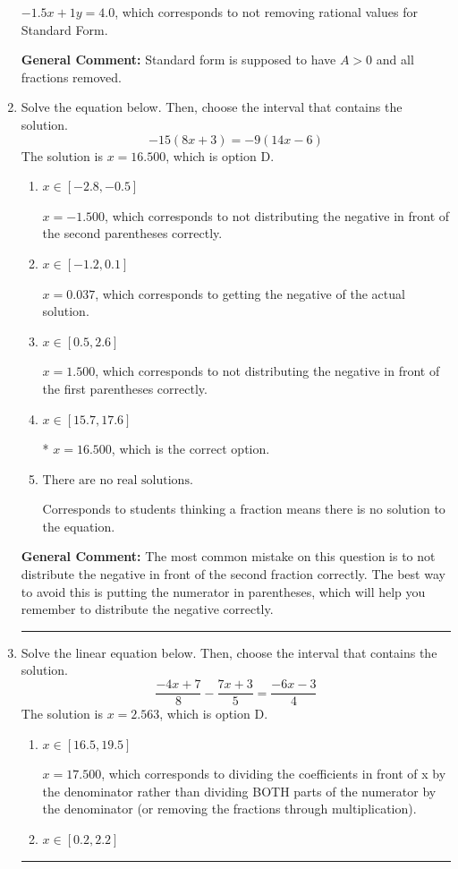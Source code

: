 \documentclass{extbook}[14pt]
\newcommand{\litem}[1]{\item #1

\rule{\textwidth}{0.4pt}}
\begin{document}
\begin{enumerate}
{\begin{enumerate}[label=\Alph*.]
 $-1.5x + 1y = 4.0$, which corresponds to not removing rational values for Standard Form.
\end{enumerate}

\textbf{General Comment:} Standard form is supposed to have $A > 0$ and all fractions removed.
}
\litem{
Solve the equation below. Then, choose the interval that contains the solution.
\[ -15(8x + 3) = -9(14x -6) \]The solution is \( x = 16.500 \), which is option D.\begin{enumerate}[label=\Alph*.]
\item \( x \in [-2.8, -0.5] \)

$x = -1.500$, which corresponds to not distributing the negative in front of the second parentheses correctly.
\item \( x \in [-1.2, 0.1] \)

$x = 0.037$, which corresponds to getting the negative of the actual solution.
\item \( x \in [0.5, 2.6] \)

$x = 1.500$, which corresponds to not distributing the negative in front of the first parentheses correctly.
\item \( x \in [15.7, 17.6] \)

* $x = 16.500$, which is the correct option.
\item \( \text{There are no real solutions.} \)

Corresponds to students thinking a fraction means there is no solution to the equation.
\end{enumerate}

\textbf{General Comment:} The most common mistake on this question is to not distribute the negative in front of the second fraction correctly. The best way to avoid this is putting the numerator in parentheses, which will help you remember to distribute the negative correctly.
}
\litem{
Solve the linear equation below. Then, choose the interval that contains the solution.
\[ \frac{-4x + 7}{8} - \frac{7x + 3}{5} = \frac{-6x -3}{4} \]The solution is \( x = 2.563 \), which is option D.\begin{enumerate}[label=\Alph*.]
\item \( x \in [16.5, 19.5] \)

 $x = 17.500$, which corresponds to dividing the coefficients in front of x by the denominator rather than dividing BOTH parts of the numerator by the denominator (or removing the fractions through multiplication).
\item \( x \in [0.2, 2.2] \)


\end{enumerate}}
\end{enumerate}
\end{document}
